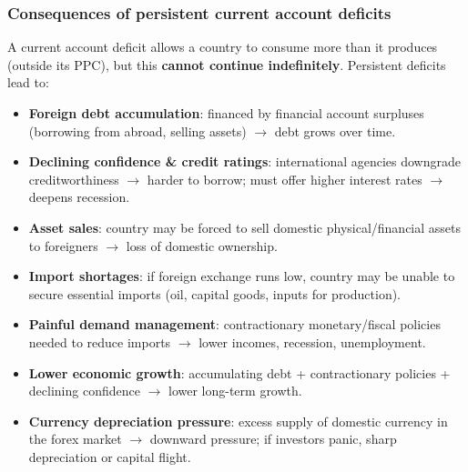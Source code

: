 \documentclass[a4paper,12pt]{article}
\begin{document}
\subsubsection*{Consequences of persistent current account deficits}
A current account deficit allows a country to consume more than it produces (outside its PPC), but this \textbf{cannot continue indefinitely}. Persistent deficits lead to:
\begin{itemize}
  \item \textbf{Foreign debt accumulation}: financed by financial account surpluses (borrowing from abroad, selling assets) $\to$ debt grows over time.
  \item \textbf{Declining confidence \& credit ratings}: international agencies downgrade creditworthiness $\to$ harder to borrow; must offer higher interest rates $\to$ deepens recession.
  \item \textbf{Asset sales}: country may be forced to sell domestic physical/financial assets to foreigners $\to$ loss of domestic ownership.
  \item \textbf{Import shortages}: if foreign exchange runs low, country may be unable to secure essential imports (oil, capital goods, inputs for production).
  \item \textbf{Painful demand management}: contractionary monetary/fiscal policies needed to reduce imports $\to$ lower incomes, recession, unemployment.
  \item \textbf{Lower economic growth}: accumulating debt + contractionary policies + declining confidence $\to$ lower long-term growth.
  \item \textbf{Currency depreciation pressure}: excess supply of domestic currency in the forex market $\to$ downward pressure; if investors panic, sharp depreciation or capital flight.
\end{itemize}
\end{document}
